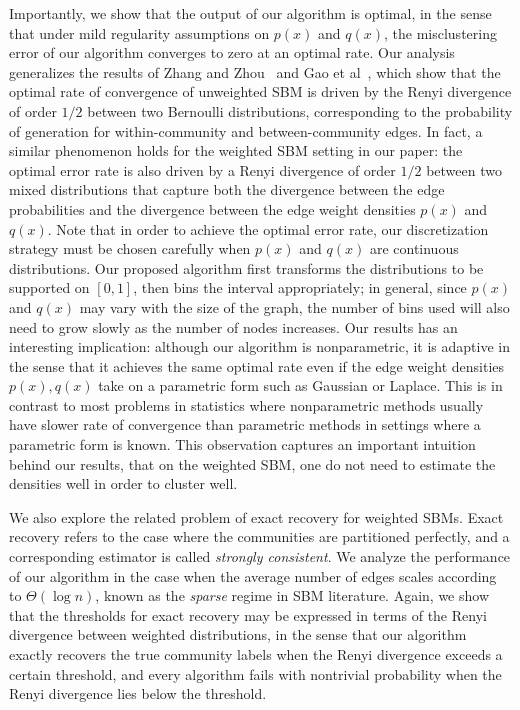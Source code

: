 Importantly, we show that the output of our algorithm is optimal, in the sense that under mild regularity assumptions on $p(x)$ and $q(x)$, the misclustering error of our algorithm converges to zero at an optimal rate. Our analysis generalizes the results of Zhang and Zhou~\cite{zhangminimax} and Gao et al~\cite{gao2015achieving}, which show that the optimal rate of convergence of unweighted SBM is driven by the Renyi divergence of order $1/2$ between two Bernoulli distributions, corresponding to the probability of generation for within-community and between-community edges. In fact, a similar phenomenon holds for the weighted SBM setting in our paper: the optimal error rate is also driven by a Renyi divergence of order $1/2$ between two mixed distributions that capture both the divergence between the edge probabilities and the divergence between the edge weight densities $p(x)$ and $q(x)$. Note that in order to achieve the optimal error rate, our discretization strategy must be chosen carefully when $p(x)$ and $q(x)$ are continuous distributions. Our proposed algorithm first transforms the distributions to be supported on $[0,1]$, then bins the interval appropriately; in general, since $p(x)$ and $q(x)$ may vary with the size of the graph, the number of bins used will also need to grow slowly as the number of nodes increases. Our results has an interesting implication: although our algorithm is nonparametric, it is adaptive in the sense that it achieves the same optimal rate even if the edge weight densities $p(x), q(x)$ take on a parametric form such as Gaussian or Laplace. This is in contrast to most problems in statistics where nonparametric methods usually have slower rate of convergence than parametric methods in settings where a parametric form is known. This observation captures an important intuition behind our results, that on the weighted SBM, one do not need to estimate the densities well in order to cluster well.


We also explore the related problem of exact recovery for weighted SBMs. Exact recovery refers to the case where the communities are partitioned perfectly, and a corresponding estimator is called \emph{strongly consistent}. We analyze the performance of our algorithm in the case when the average number of edges scales according to $\Theta(\log n)$, known as the \emph{sparse} regime in SBM literature. Again, we show that the thresholds for exact recovery may be expressed in terms of the Renyi divergence between weighted distributions, in the sense that our algorithm exactly recovers the true community labels when the Renyi divergence exceeds a certain threshold, and every algorithm fails with nontrivial probability when the Renyi divergence lies below the threshold.

